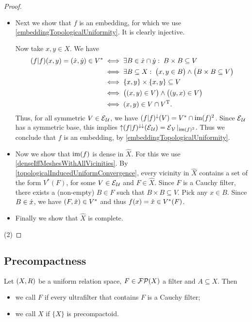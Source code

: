 \begin{proof}
\begin{itemize}
\item Next we show that $f$ is an embedding, for which we use \ref{embeddingTopologicalUniformity}. It is clearly injective.

Now take $x,y\in X$. We have
\begin{align*}
(f|f)(x,y) = (\dot{x}, \dot{y})\in V^* &\iff \exists B\in \dot{x}\cap\dot{y}: \; B\times B\subseteq V \\
&\iff \exists B \subseteq X: \; \big(x,y\in B\big) \land \big(B\times B\subseteq V\big) \\
&\iff \{x,y\}\times \{x,y\}\subseteq V \\
&\iff \big((x,y)\in V\big)\land \big((y,x)\in V\big) \\
&\iff (x,y)\in V\cap V^{\mathrm{T}}.
\end{align*}
Thus, for all symmetric $V\in \operatorname{\mathcal{E}}_\mathcal{U}$, we have $(f|f)^{\downarrow}(V) = V^* \cap \operatorname{im}(f)^2$. Since $\operatorname{\mathcal{E}}_\mathcal{U}$ has a symmetric base, this implies $\operatorname{\uparrow}(f|f)^{\downarrow\downarrow}(\operatorname{\mathcal{E}}_\mathcal{U}) = \operatorname{\mathcal{E}}_{\mathcal{V}}|_{\operatorname{im}(f)^2}$. Thus we conclude that $f$ is an embedding, by \ref{embeddingTopologicalUniformity}.

\item Now we show that $\operatorname{im}(f)$ is dense in $\hat{X}$.
For this we use \ref{denseIffMeshesWithAllVicinities}. By \ref{topologicalInducedUniformConvergence}, every vicinity in $\hat{X}$ contains a set of the form $V^*(F)$, for some $V\in \operatorname{\mathcal{E}}_\mathcal{U}$ and $F\in\hat{X}$. Since $F$ is a Cauchy filter, there exists a (non-empty) $B\in F$ such that $B\times B\subseteq V$. Pick any $x\in B$. Since $B\in \dot{x}$, we have $(F, \dot{x})\in V^*$ and thus $f(x) = \dot{x} \in V^*(F)$.

\item Finally we show that $\hat{X}$ is complete.
\end{itemize}
(2) 
\end{proof}

\subsection{Precompactness}
\begin{definition}
Let $\sSet{X,R}$ be a uniform relation space, $F\in\operatorname{\mathcal{FP}}(X)$ a filter and $A\subseteq X$.
Then 
\begin{itemize}
\item we call $F$  if every ultrafilter that contains $F$ is a Cauchy filter;
\item we call $X$  if $\{X\}$ is precompactoid.
\end{itemize}
\end{definition}

